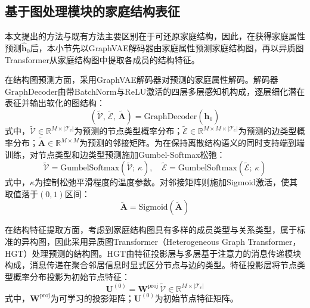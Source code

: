 \subsection{基于图处理模块的家庭结构表征}\label{subsec.popsyn.model.graph}
 
本文提出的方法与既有方法主要区别在于可还原家庭结构，因此，在获得家庭属性预测$\hat{\mathbf{h}}_0$后，本小节先以GraphVAE解码器由家庭属性预测家庭结构图，再以异质图Transformer从家庭结构图中提取各成员的结构特征。
 
在结构图预测方面，采用GraphVAE解码器\cite{simonovskyGraphVAEGenerationSmall2018}对预测的家庭属性解码。解码器$\mathrm{GraphDecoder}$由带BatchNorm与ReLU激活的四层多层感知机构成，逐层细化潜在表征并输出软化的图结构：
\begin{equation}
  \left(\tilde{\mathcal{V}},\, \tilde{\mathcal{E}},\, \tilde{\mathbf{A}}\right) = \mathrm{GraphDecoder}\left(\hat{\mathbf{h}}_0\right)
  \label{eq.popsyn.graphdec}
\end{equation}
式中，$\tilde{\mathcal{V}} \in \mathbb{R}^{M \times |\mathcal{T}_v|}$为预测的节点类型概率分布；$\tilde{\mathcal{E}} \in \mathbb{R}^{M \times M \times |\mathcal{T}_e|}$为预测的边类型概率分布；$\tilde{\mathbf{A}} \in \mathbb{R}^{M \times M}$为预测的邻接矩阵。为在保持离散结构语义的同时支持端到端训练，对节点类型和边类型预测施加Gumbel-Softmax松弛\cite{jangCategoricalReparameterizationGumbelSoftmax2017}：
\begin{equation}
  \tilde{\mathcal{V}} = \mathrm{GumbelSoftmax}\left(\tilde{\mathcal{V}};\, \kappa\right), \quad
  \tilde{\mathcal{E}} = \mathrm{GumbelSoftmax}\left(\tilde{\mathcal{E}};\, \kappa\right)
  \label{eq.popsyn.gumbel}
\end{equation}
式中，$\kappa$为控制松弛平滑程度的温度参数。对邻接矩阵则施加Sigmoid激活，使其取值落于$(0, 1)$区间：
\begin{equation}
  \tilde{\mathbf{A}} = \mathrm{Sigmoid}\left(\tilde{\mathbf{A}}\right)
  \label{eq.popsyn.adjsig}
\end{equation}
 
在结构特征提取方面，考虑到家庭结构图具有多样的成员类型与关系类型，属于标准的异构图，因此采用异质图Transformer（Heterogeneous Graph Transformer，HGT）\cite{huHeterogeneousGraphTransformer2020}处理预测的结构图。HGT由特征投影层与多层基于注意力的消息传递模块构成，消息传递在聚合邻居信息时显式区分节点与边的类型。特征投影层将节点类型概率分布投影为初始节点特征：
\begin{equation}
  \mathbf{U}^{(0)} = \mathbf{W}^{\mathrm{proj}}\, \tilde{\mathcal{V}} \in \mathbb{R}^{M \times |\mathcal{T}_v|}
  \label{eq.popsyn.hgtproj}
\end{equation}
式中，$\mathbf{W}^{\mathrm{proj}}$为可学习的投影矩阵；$\mathbf{U}^{(0)}$为初始节点特征矩阵。
 
